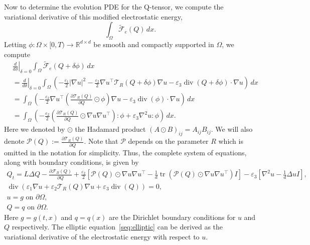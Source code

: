 \documentclass[10pt,letterpaper]{amsart}
\newcommand{\R}{\mathbb{R}}
\renewcommand{\div}{\operatorname{div}}
\newcommand{\T}{\mathcal T}
\renewcommand{\P}{\mathcal P}
\theoremstyle{definition}{\newtheorem{definition}[lemma]{Definition}}
\theoremstyle{note}{\newtheorem{claim}{Claim}[section]
\newtheorem*{claim*}{Claim}}
\numberwithin{equation}{section}
\begin{document}
Now to determine the evolution PDE for the Q-tensor, we compute the variational derivative of this modified electrostatic energy,
\[
    \int_\Omega \tilde{\mathcal{F}}_e(Q)\, dx.
\]
Letting $\phi:\Omega\times[0,T) \to \R^{d\times d}$ be smooth and compactly supported in $\Omega$, we compute
\begin{align*}
    &\left.\frac{d}{d\delta}\right\lvert_{\delta=0} \int_\Omega \tilde{\mathcal{F}}_e(Q+\delta\phi)\, dx\\
        &= \left.\frac{d}{d\delta}\right\lvert_{\delta=0} \int_\Omega \left(-\frac{\varepsilon_1}{2} \lvert \nabla u\rvert^2 -\frac{\varepsilon_2}{2} \nabla u^\top \T_R(Q+\delta\phi)\nabla u - \varepsilon_3\operatorname{div}(Q+\delta\phi)\cdot\nabla u\right)\, dx\\
        &= \int_\Omega \left(-\frac{\varepsilon_2}{2} \nabla u^\top\left(\frac{\partial\T_R(Q)}{\partial Q}\odot\phi\right)\nabla u - \varepsilon_3\operatorname{div}(\phi)\cdot\nabla u\right)\, dx\\
        &= \int_\Omega \left(-\frac{\varepsilon_2}{2} \left(\frac{\partial\T_R(Q)}{\partial Q}\odot \nabla u\nabla u^\top\right):\phi + \varepsilon_3\nabla^2 u:\phi\right)\, dx.
\end{align*}
Here we denoted by $\odot$ the Hadamard product $(A\odot B)_{ij} = A_{ij} B_{ij}$.
We will also denote $\P(Q) := \frac{\partial\T_R(Q)}{\partial Q}$. Note that $\P$ depends on the parameter $R$ which is omitted in the notation for simplicity. 
Thus, the complete system of equations, along with boundary conditions, is given by
\begin{subequations}
\label{eq:system_strong_formulation}
\begin{align}
    Q_t = L\Delta Q - \frac{\partial \mathcal{F}_B(Q)}{\partial Q} + \frac{\varepsilon_2}{2}\left[\P(Q)\odot\nabla u\nabla u^\top - \frac1d\operatorname{tr}\left(\P(Q)\odot\nabla u\nabla u^\top\right)I\right]- \varepsilon_3\left[\nabla^2u - \frac1d\Delta uI\right],\\
    \div(\varepsilon_1\nabla u + \varepsilon_2 \T_R(Q)\nabla u + \varepsilon_3\div(Q)) = 0,\label{seq:elliptic}\\
    u = g \text{ on } \partial\Omega,\\
    Q = q \text{ on } \partial \Omega.
\end{align}
\end{subequations}
Here $g=g(t,x)$ and $q=q(x)$ are the Dirichlet boundary conditions for $u$ and $Q$ respectively.
The elliptic equation~\eqref{seq:elliptic} can be derived as the variational derivative of the electrostatic energy with respect to $u$. 
\end{document}
